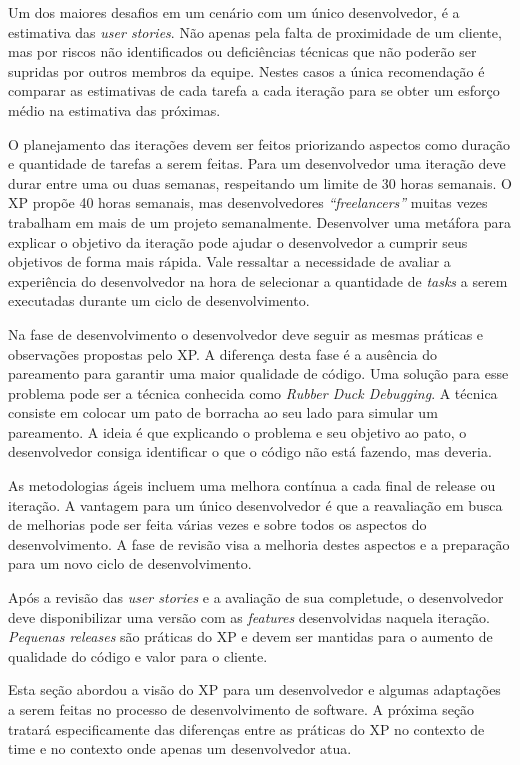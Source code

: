 Um dos maiores desafios em um cenário com um único desenvolvedor, é a estimativa das \textit{user stories}. Não apenas pela falta de proximidade de um cliente, mas por riscos não identificados ou deficiências técnicas que não poderão ser supridas por outros membros da equipe. Nestes casos a única recomendação é comparar as estimativas de cada tarefa a cada iteração para se obter um esforço médio na estimativa das próximas.  \cite{Bernabe:2015}

O planejamento das iterações devem ser feitos priorizando aspectos como duração e quantidade de tarefas a serem feitas. Para um desenvolvedor uma iteração deve durar entre uma ou duas semanas, respeitando um limite de 30 horas semanais. O XP propõe 40 horas semanais, mas desenvolvedores \textit{“freelancers”} muitas vezes trabalham em mais de um projeto semanalmente. Desenvolver uma metáfora para explicar o objetivo da iteração pode ajudar o desenvolvedor a cumprir seus objetivos de forma mais rápida. Vale ressaltar a necessidade de avaliar a experiência do desenvolvedor na hora de selecionar a quantidade de \textit{tasks} a serem executadas durante um ciclo de desenvolvimento. \cite{Bernabe:2015}

Na fase de desenvolvimento o desenvolvedor deve seguir as mesmas práticas e observações propostas pelo XP. A diferença desta fase é a ausência do pareamento para garantir uma maior qualidade de código. Uma solução para esse problema pode ser a técnica conhecida como \textit{Rubber Duck Debugging}. \cite{Andrew:2002} A técnica consiste em colocar um pato de borracha ao seu lado para simular um pareamento. A ideia é que explicando o problema e seu objetivo ao pato, o desenvolvedor consiga identificar o que o código não está fazendo, mas deveria.

As metodologias ágeis incluem uma melhora contínua a cada final de release ou iteração. A vantagem para um único desenvolvedor é que a reavaliação em busca de melhorias pode ser feita várias vezes e sobre todos os aspectos do desenvolvimento. \cite{Bernabe:2015} A fase de revisão visa a melhoria destes aspectos e a preparação para um novo ciclo de desenvolvimento.

Após a revisão das \textit{user stories} e a avaliação de sua completude, o desenvolvedor deve disponibilizar uma versão com as \textit{features} desenvolvidas naquela iteração. \textit{Pequenas releases} são práticas do XP e devem ser mantidas para o aumento de qualidade do código e valor para o cliente.

Esta seção abordou a visão do XP para um desenvolvedor e algumas adaptações a serem feitas no processo de desenvolvimento de software. A próxima seção tratará especificamente das diferenças entre as práticas do XP no contexto de time e no contexto onde apenas um desenvolvedor atua.

